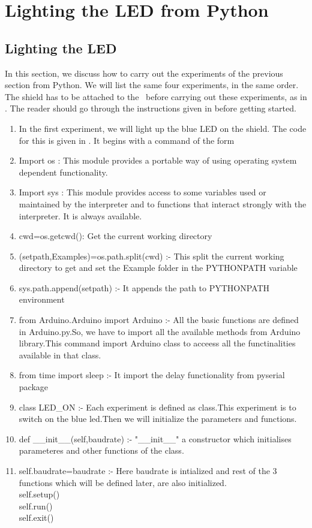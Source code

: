 \section{Lighting the LED from Python}
\subsection{Lighting the LED}
\label{sec:light-py}
In this section, we discuss how to carry out the experiments of the
previous section from Python.  We will list the same four experiments,
in the same order.  The shield has to be attached to the \arduino\
before carrying out these experiments, as in .
The reader should go through the instructions given in
 before getting started.
\begin{enumerate}
  \item In the first experiment, we will light up the blue LED on the
    shield.  The code for this is given in \pyref{py:led-blue}. It begins with a command of the form
  \item Import os : This module provides a portable way of using operating system dependent functionality.
  \item Import sys : This module provides access to some variables used or maintained by the interpreter
        and to functions that interact strongly with the interpreter. It is always available.
  \item cwd=os.getcwd(): Get the current working directory
  \item (setpath,Examples)=os.path.split(cwd) :- This split the current working directory to get and set the Example folder in the PYTHONPATH variable
  \item sys.path.append(setpath) :- It appends the path to PYTHONPATH environment
  \item from Arduino.Arduino import Arduino :- All the basic functions are defined in Arduino.py.So, we have to import all the available methods from Arduino library.This command import Arduino class to acceess all the functinalities available in that class.
  \item from time import sleep :- It import the delay functionality from pyserial package
  \item class LED\_ON :- Each experiment is defined as class.This experiment
        is to switch on the blue led.Then we will initialize the parameters and functions.
  \item def \_\_init\_\_(self,baudrate) :- "\_\_init\_\_" a constructor which initialises parameteres and other functions of the class.
  \item self.baudrate=baudrate :- Here baudrate is intialized and rest of the  3 functions which will be defined later, are also initialized.\\
        self.setup() \\
        self.run()   \\
        self.exit()  \\
        

\end{enumerate}

